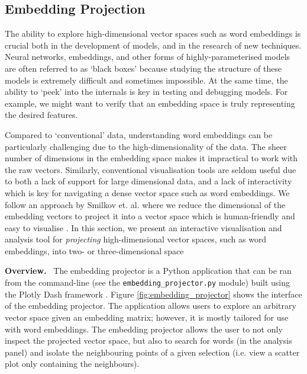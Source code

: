 \documentclass{paper}
\newcommand{\inlineSection}[1]{\vspace{0.5em}\noindent\textbf{#1.}~}
\begin{document}

\subsection{Embedding Projection}
The ability to explore high-dimensional vector spaces such as word embeddings is crucial both in the development of models, and in the research of new techniques. Neural networks, embeddings, and other forms of highly-parameterised models are often referred to as `black boxes' because studying the structure of these models is extremely difficult and sometimes impossible. At the same time, the ability to `peek' into the internals is key in testing and debugging models. For example, we might want to verify that an embedding space is truly representing the desired features.

Compared to `conventional' data, understanding word embeddings can be particularly challenging due to the high-dimensionality of the data. The sheer number of dimensions in the embedding space makes it impractical to work with the raw vectors. Similarly, conventional visualisation tools are seldom useful due to both a lack of support for large dimensional data, and a lack of interactivity which is key for navigating a dense vector space such as word embeddings. We follow an approach by Smilkov et. al. where we reduce the dimensional of the embedding vectors to project it into a vector space which is human-friendly and easy to visualise \cite{smilkov2016embedding}. In this section, we present an interactive visualisation and analysis tool for \textit{projecting} high-dimensional vector spaces, such as word embeddings, into two- or three-dimensional space

\inlineSection{Overview} The embedding projector is a Python application that can be ran from the command-line (see the \texttt{embedding\_projector.py} module) built using the Plotly Dash framework \cite{plotly}. Figure \ref{fig:embedding_projector} shows the interface of the embedding projector. The application allows users to explore an arbitrary vector space given an embedding matrix; however, it is mostly tailored for use with word embeddings. The embedding projector allows the user to not only inspect the projected vector space, but also to search for words (in the analysis panel) and isolate the neighbouring points of a given selection (i.e. view a scatter plot only containing the neighbours).
\end{document}
